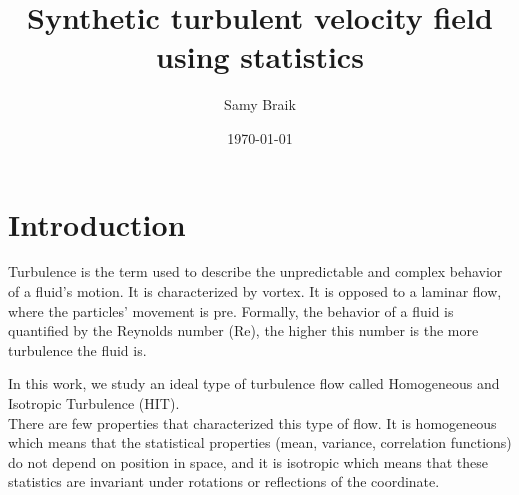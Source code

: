 \documentclass[a4paper,12pt]{article}
\title{Synthetic turbulent velocity field using statistics}
\author{Samy Braik}
\date{\today}
\begin{document}
\maketitle


\newpage
\tableofcontents
\newpage

\section{Introduction}
Turbulence is the term used to describe the unpredictable and complex behavior of a fluid's motion. It is characterized by vortex. It is opposed to a laminar flow, where the particles' movement is pre. Formally, the behavior of a fluid is quantified by the Reynolds number (Re), the higher this number is the more turbulence the fluid is. 

\bigskip

In this work, we study an ideal type of turbulence flow called Homogeneous and Isotropic Turbulence (HIT). \\
There are few properties that characterized this type of flow. It is homogeneous which means that the statistical properties (mean, variance, correlation functions) do not depend on position in space, and it is isotropic which means that these statistics are invariant under rotations or reflections of the coordinate.\\


\bigskip
\end{document}
